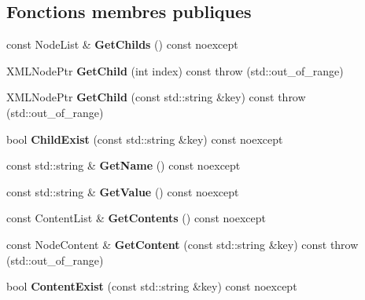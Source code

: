 \subsection*{Fonctions membres publiques}
\begin{DoxyCompactItemize}
\item 
\mbox{\label{classmy_1_1XMLNode_ade94859a6e39c1e82a83ba17fe6e9040}} 
const Node\+List \& {\bfseries Get\+Childs} () const noexcept
\item 
\mbox{\label{classmy_1_1XMLNode_a726e86d6b2d893cf98854b2c18d5dbd5}} 
X\+M\+L\+Node\+Ptr {\bfseries Get\+Child} (int index) const  throw (std\+::out\+\_\+of\+\_\+range)
\item 
\mbox{\label{classmy_1_1XMLNode_a6e4e52f86a22d66ac713bad4f7be8441}} 
X\+M\+L\+Node\+Ptr {\bfseries Get\+Child} (const std\+::string \&key) const  throw (std\+::out\+\_\+of\+\_\+range)
\item 
\mbox{\label{classmy_1_1XMLNode_af9796ae48e9b501b49cb6465f2345a09}} 
bool {\bfseries Child\+Exist} (const std\+::string \&key) const noexcept
\item 
\mbox{\label{classmy_1_1XMLNode_a6607973f3b38f691783db131b48fb620}} 
const std\+::string \& {\bfseries Get\+Name} () const noexcept
\item 
\mbox{\label{classmy_1_1XMLNode_ae416de0db54eedd113518c7aa7c0ab4e}} 
const std\+::string \& {\bfseries Get\+Value} () const noexcept
\item 
\mbox{\label{classmy_1_1XMLNode_a4f82f05c3eda5d0819415697dbdf708a}} 
const Content\+List \& {\bfseries Get\+Contents} () const noexcept
\item 
\mbox{\label{classmy_1_1XMLNode_a1a06e4643c4761c9be7b48c52f0f8578}} 
const Node\+Content \& {\bfseries Get\+Content} (const std\+::string \&key) const  throw (std\+::out\+\_\+of\+\_\+range)
\item 
\mbox{\label{classmy_1_1XMLNode_a388fe80598af8a552a19d28d91e197b3}} 
bool {\bfseries Content\+Exist} (const std\+::string \&key) const noexcept

\end{DoxyCompactItemize}
